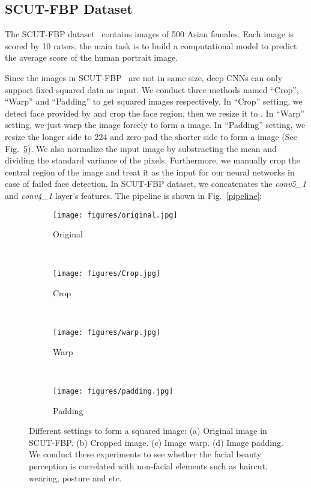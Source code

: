 \documentclass[a4paper,conference]{IEEEtran}
\begin{document}
  \subsection{SCUT-FBP Dataset}
    The SCUT-FBP dataset~\cite{xie2015scut} contains images of 500 Asian females.
    Each image is scored by 10 raters, the main task is to build a computational
    model to predict the average score of the human portrait image.

    Since the images in SCUT-FBP~\cite{xie2015scut} are not in same size,
    deep CNNs can only support fixed squared data as input. We conduct three
    methods named ``Crop'', ``Warp'' and ``Padding'' to get squared images
    respectively.
    In ``Crop'' setting, we detect face provided by \cite{King2009Dlib}
    and crop the face region, then we resize it to .
    In ``Warp'' setting, we just warp the image forcely to form a
     image.
    In ``Padding'' setting, we resize the longer side
    to 224 and zero-pad the shorter side to form a  image
    (See Fig.~\ref{warp_and_padding}). We also normalize the input image
    by substracting the mean and dividing the standard variance of the pixels.
    Furthermore, we manually crop the central region of the image and treat it
    as the input for our neural networks in case of failed face detection.
    In SCUT-FBP dataset, we concatenates the \emph{conv5\_1} and \emph{conv4\_1}
    layer's features. The pipeline is shown in Fig.~\ref{pipeline}:

    \begin{figure}
      \centering
      \begin{subfigure}[b]{0.1\textwidth}
          \texttt{[image: figures/original.jpg]}
          \caption{Original}
          \label{fig:original}
      \end{subfigure}
      ~
      \begin{subfigure}[b]{0.1\textwidth}
          \texttt{[image: figures/Crop.jpg]}
          \caption{Crop}
          \label{fig:crop}
      \end{subfigure}
      ~
      \begin{subfigure}[b]{0.1\textwidth}
          \texttt{[image: figures/warp.jpg]}
          \caption{Warp}
          \label{fig:warp}
      \end{subfigure}
      ~
      \begin{subfigure}[b]{0.1\textwidth}
          \texttt{[image: figures/padding.jpg]}
          \caption{Padding}
          \label{fig:padding}
      \end{subfigure}
      \caption{Different settings to form a squared image:
        (a) Original image in SCUT-FBP.
        (b) Cropped image.
        (c) Image warp.
        (d) Image padding.
        We conduct these experiments to see whether the facial beauty perception
        is correlated with non-facial elements such as haircut, wearing, posture
        and etc.
      }
      \label{warp_and_padding}
    \end{figure}
\end{document}
